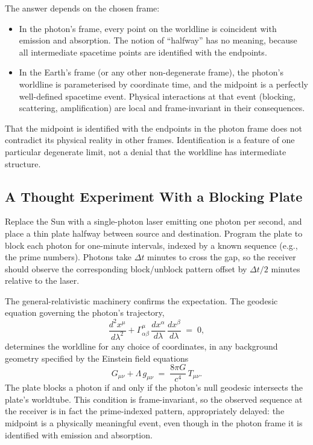 \documentclass[11pt]{article}
\begin{document}
The answer depends on the chosen frame:
\begin{itemize}
\item In the photon's frame, every point on the worldline is coincident with emission and absorption. The notion of ``halfway'' has no meaning, because all intermediate spacetime points are identified with the endpoints.
\item In the Earth's frame (or any other non-degenerate frame), the photon's worldline is parameterised by coordinate time, and the midpoint is a perfectly well-defined spacetime event. Physical interactions at that event (blocking, scattering, amplification) are local and frame-invariant in their consequences.
\end{itemize}

That the midpoint is identified with the endpoints in the photon frame does not contradict its physical reality in other frames. Identification is a feature of one particular degenerate limit, not a denial that the worldline has intermediate structure.

\subsection{A Thought Experiment With a Blocking Plate}

Replace the Sun with a single-photon laser emitting one photon per second, and place a thin plate halfway between source and destination. Program the plate to block each photon for one-minute intervals, indexed by a known sequence (e.g., the prime numbers). Photons take $\Delta t$ minutes to cross the gap, so the receiver should observe the corresponding block/unblock pattern offset by $\Delta t/2$ minutes relative to the laser.

The general-relativistic machinery confirms the expectation. The geodesic equation governing the photon's trajectory,
\begin{equation}
\frac{d^2 x^\mu}{d\lambda^2} + \Gamma^\mu_{\alpha\beta}\,
\frac{dx^\alpha}{d\lambda}\,\frac{dx^\beta}{d\lambda} \;=\; 0,
\label{eq:geodesic}
\end{equation}
determines the worldline for any choice of coordinates, in any background geometry specified by the Einstein field equations
\begin{equation}
G_{\mu\nu} + \Lambda\,g_{\mu\nu} \;=\; \frac{8\pi G}{c^4}\,T_{\mu\nu}.
\label{eq:efe}
\end{equation}
The plate blocks a photon if and only if the photon's null geodesic intersects the plate's worldtube. This condition is frame-invariant, so the observed sequence at the receiver is in fact the prime-indexed pattern, appropriately delayed: the midpoint is a physically meaningful event, even though in the photon frame it is identified with emission and absorption.
\end{document}
